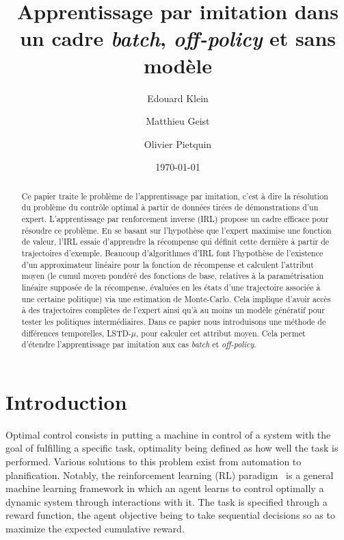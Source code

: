 \documentclass{jfpda2011}
\title{Apprentissage par imitation dans un cadre \emph{batch}, \emph{off-policy} et sans modèle}
\author{Edouard Klein\inst{1}\inst{3} \and Matthieu Geist\inst{1} \and Olivier Pietquin\inst{1}\inst{2}}
\institute{
 1. Supélec-Metz Campus, IMS Research group, France, \texttt{nom.prenom@supelec.fr}\\
 2. UMI 2958 CNRS - GeorgiaTech, France\\
 3. Equipe ABC, LORIA-CNRS, France.
 }
\date{\today}
\begin{document}
\maketitle
\begin{abstract}
 Ce papier traite le problème de l'apprentissage par imitation, c'est à dire la résolution du problème du contrôle optimal à partir de données tirées de démonstrations d'un expert. L'apprentissage par renforcement inverse (IRL) propose un cadre efficace pour résoudre ce problème. En se basant sur l'hypothèse que l'expert maximise une fonction de valeur,  l'IRL essaie d'apprendre la récompense qui définit cette dernière à partir de trajectoires d'exemple. Beaucoup d'algorithmes d'IRL font l'hypothèse de l'existence d'un approximateur linéaire pour la fonction de récompense et calculent l'attribut moyen (le cumul moyen pondéré des fonctions de base, relatives à la paramétrisation linéaire supposée de la récompense, évaluées en les états d'une trajectoire associée à une certaine politique)  via une estimation de Monte-Carlo. Cela implique d'avoir accès à des trajectoires complètes de l'expert ainsi qu'à au moins un modèle génératif pour tester les politiques intermédiaires. Dans ce papier nous introduisons une méthode de différences temporelles, LSTD-$\mu$, pour calculer cet attribut moyen. Cela permet d'étendre l'apprentissage par imitation aux cas \emph{batch} et \emph{off-policy}.
\end{abstract}
\section{Introduction}

Optimal control consists in putting a machine in control of a system
with the goal of fulfilling a specific task, optimality being
defined as how well the task is performed. Various solutions to this
problem exist from automation to planification. Notably, the
reinforcement learning (RL) paradigm~\citep{sutton1998reinforcement} is a general
machine learning framework in which an agent learns to control
optimally a dynamic system through interactions with it. The task is
specified through a reward function, the agent objective being to
take sequential decisions so as to maximize the expected cumulative
reward.
\end{document}
